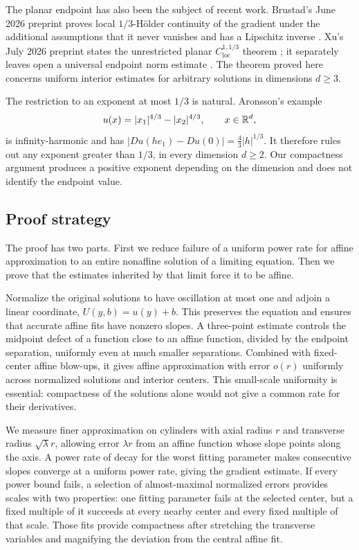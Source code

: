 The planar endpoint has also been the subject of recent work. Brustad's
June 2026 preprint proves local $1/3$-H\"older continuity of the gradient
under the additional assumptions that it never vanishes and has a
Lipschitz inverse \cite[Theorem~1.1]{Brustad2026}.
Xu's July 2026 preprint states the unrestricted planar
$C^{1,1/3}_{\mathrm{loc}}$ theorem
\cite[Theorem~1.1]{Xu2026}; it separately leaves open a universal
endpoint norm estimate \cite[Remark~1.5(i)]{Xu2026}.
The theorem proved here concerns uniform interior estimates for arbitrary
solutions in dimensions $d\ge3$.

The restriction to an exponent at most $1/3$ is natural. Aronsson's
example \cite{Aronsson1984}
\[
  u(x)=|x_1|^{4/3}-|x_2|^{4/3},\qquad x\in\mathbb{R}^d,
\]
is infinity-harmonic and has
$|Du(he_1)-Du(0)|=\tfrac43|h|^{1/3}$.
It therefore rules out any exponent greater than $1/3$, in every
dimension $d\ge2$. Our compactness argument produces a positive exponent
depending on the dimension and does not identify the endpoint value.

\subsection{Proof strategy}
The proof has two parts. First we reduce failure of a uniform power
rate for affine approximation to an entire nonaffine solution of a
limiting equation. Then we prove that the estimates inherited by
that limit force it to be affine.

Normalize the original solutions to have oscillation at most one and
adjoin a linear coordinate, $U(y,b)=u(y)+b$. This preserves the equation
and ensures that accurate affine fits have nonzero slopes. A three-point
estimate controls the midpoint defect of a function close to an affine
function, divided by the endpoint separation, uniformly even at much
smaller separations. Combined with fixed-center affine blow-ups, it
gives affine approximation with error $o(r)$ uniformly across normalized
solutions and interior centers. This small-scale uniformity is essential:
compactness of the solutions alone would not give a common rate for
their derivatives.

We measure finer approximation on cylinders with axial radius $r$ and
transverse radius $\sqrt\lambda r$, allowing error $\lambda r$ from an
affine function whose slope points along the axis. A power rate of decay
for the worst fitting parameter makes consecutive slopes converge at a
uniform power rate, giving the gradient estimate. If every power bound
fails, a selection of almost-maximal normalized errors provides scales
with two properties: one fitting parameter fails at the selected center,
but a fixed multiple of it succeeds at every nearby center and every
fixed multiple of that scale. Those fits provide compactness after
stretching the transverse variables and magnifying the deviation from
the central affine fit.

